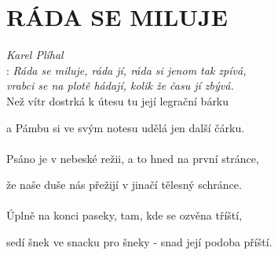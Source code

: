\section*{\Huge RÁDA SE MILUJE}
\emph{Karel Plíhal}\\

\textregistered: \emph{Ráda se miluje, ráda jí,
ráda si jenom tak zpívá,\\
vrabci se na plotě hádají,
kolik že času jí zbývá.}\\

Než vítr dostrká k útesu tu její legrační bárku

a Pámbu si ve svým notesu udělá jen další čárku.\\

\textregistered\\

Psáno je v nebeské režii, a to hned na první stránce,

že naše duše nás přežijí v jinačí tělesný schránce.\\

\textregistered\\

Úplně na konci paseky, tam, kde se ozvěna tříští,

sedí šnek ve snacku pro šneky - snad její podoba příští.\\

\textregistered

\newpage

